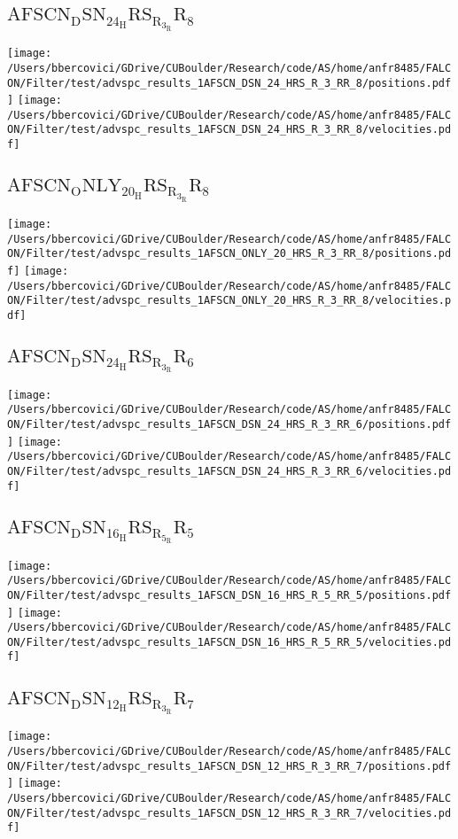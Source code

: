 \subsection{$\mathrm{AFSCN_DSN_24_HRS_R_3_RR_8}$}
\texttt{[image: /Users/bbercovici/GDrive/CUBoulder/Research/code/AS/home/anfr8485/FALCON/Filter/test/advspc\_results\_1AFSCN\_DSN\_24\_HRS\_R\_3\_RR\_8/positions.pdf]}
\texttt{[image: /Users/bbercovici/GDrive/CUBoulder/Research/code/AS/home/anfr8485/FALCON/Filter/test/advspc\_results\_1AFSCN\_DSN\_24\_HRS\_R\_3\_RR\_8/velocities.pdf]}
\subsection{$\mathrm{AFSCN_ONLY_20_HRS_R_3_RR_8}$}
\texttt{[image: /Users/bbercovici/GDrive/CUBoulder/Research/code/AS/home/anfr8485/FALCON/Filter/test/advspc\_results\_1AFSCN\_ONLY\_20\_HRS\_R\_3\_RR\_8/positions.pdf]}
\texttt{[image: /Users/bbercovici/GDrive/CUBoulder/Research/code/AS/home/anfr8485/FALCON/Filter/test/advspc\_results\_1AFSCN\_ONLY\_20\_HRS\_R\_3\_RR\_8/velocities.pdf]}
\subsection{$\mathrm{AFSCN_DSN_24_HRS_R_3_RR_6}$}
\texttt{[image: /Users/bbercovici/GDrive/CUBoulder/Research/code/AS/home/anfr8485/FALCON/Filter/test/advspc\_results\_1AFSCN\_DSN\_24\_HRS\_R\_3\_RR\_6/positions.pdf]}
\texttt{[image: /Users/bbercovici/GDrive/CUBoulder/Research/code/AS/home/anfr8485/FALCON/Filter/test/advspc\_results\_1AFSCN\_DSN\_24\_HRS\_R\_3\_RR\_6/velocities.pdf]}
\subsection{$\mathrm{AFSCN_DSN_16_HRS_R_5_RR_5}$}
\texttt{[image: /Users/bbercovici/GDrive/CUBoulder/Research/code/AS/home/anfr8485/FALCON/Filter/test/advspc\_results\_1AFSCN\_DSN\_16\_HRS\_R\_5\_RR\_5/positions.pdf]}
\texttt{[image: /Users/bbercovici/GDrive/CUBoulder/Research/code/AS/home/anfr8485/FALCON/Filter/test/advspc\_results\_1AFSCN\_DSN\_16\_HRS\_R\_5\_RR\_5/velocities.pdf]}
\subsection{$\mathrm{AFSCN_DSN_12_HRS_R_3_RR_7}$}
\texttt{[image: /Users/bbercovici/GDrive/CUBoulder/Research/code/AS/home/anfr8485/FALCON/Filter/test/advspc\_results\_1AFSCN\_DSN\_12\_HRS\_R\_3\_RR\_7/positions.pdf]}
\texttt{[image: /Users/bbercovici/GDrive/CUBoulder/Research/code/AS/home/anfr8485/FALCON/Filter/test/advspc\_results\_1AFSCN\_DSN\_12\_HRS\_R\_3\_RR\_7/velocities.pdf]}
